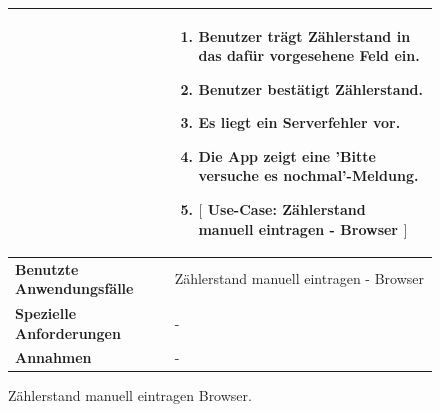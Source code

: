 \begin{figure}[h]
	\centering
	\begin{tabularx}{\textwidth}{ X | X }
		&
		\begin{enumerate}
			\item Benutzer trägt Zählerstand in das dafür vorgesehene Feld ein.
			\item Benutzer bestätigt Zählerstand.
			\item Es liegt ein Serverfehler vor.
			\item Die App zeigt eine 'Bitte versuche es nochmal'-Meldung.
			\item $\lbrack$ Use-Case: Zählerstand manuell eintragen - Browser $\rbrack$
		\end{enumerate} \\ \hline
		\textbf{Benutzte Anwendungsfälle} & Zählerstand manuell eintragen - Browser \\ \hline
		\textbf{Spezielle Anforderungen} & - \\ \hline
		\textbf{Annahmen} & -
	\end{tabularx}
	\caption{Zählerstand manuell eintragen Browser.}
	\label{fig:anwendungsfall-server-tabelle-xx-1}
\end{figure}

\newpage

